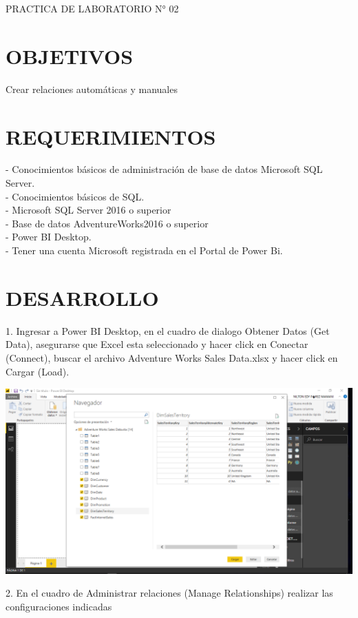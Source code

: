 \begin{center}
    PRACTICA DE LABORATORIO N° 02
\end{center}

\section{OBJETIVOS}
Crear relaciones automáticas y manuales

\section{REQUERIMIENTOS}

\begin{itemize}

- Conocimientos básicos de administración de base de datos Microsoft   SQL Server.
\\- Conocimientos básicos de SQL.
\\- Microsoft SQL Server 2016 o superior
\\- Base de datos AdventureWorks2016 o superior
\\- Power BI Desktop.
\\- Tener una cuenta Microsoft registrada en el Portal de Power Bi.
\end{itemize}

\section{DESARROLLO} 

\begin{itemize}
1. Ingresar a Power BI Desktop, en el cuadro de dialogo Obtener Datos (Get Data), asegurarse que Excel esta seleccionado y hacer click en Conectar (Connect), buscar el archivo Adventure Works Sales Data.xlsx y hacer click en Cargar (Load).

\end{itemize} 

\begin{center}
\includegraphics[width=15cm]{./Imagenes/img1} 
\end{center}
\newpage
\begin{itemize}
2. En el cuadro de Administrar relaciones (Manage Relationships) realizar las configuraciones indicadas 
\end{itemize} 

